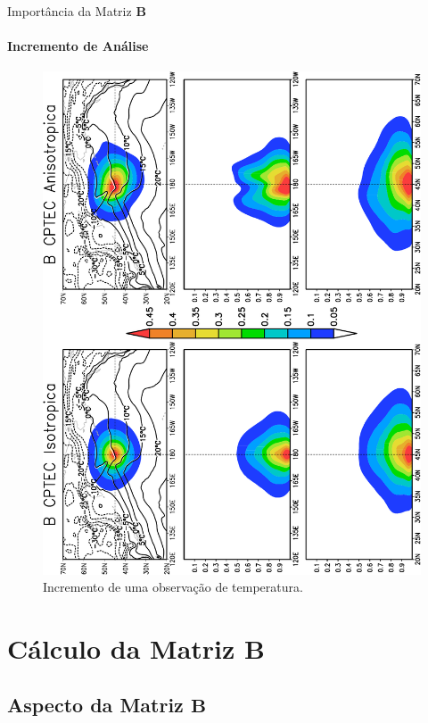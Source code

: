 \documentclass[10pt,aspectratio=169]{beamer}
\begin{document}
\begin{frame}[fragile]{Importância da Matriz $\mathbf{B}$}
\framesubtitle{Incremento de Análise}
    \vspace{-1.5em}
    \begin{figure}[H]
      \centering
      \includegraphics[trim={0.9cm
      0 13cm 14.25cm},clip,scale=1.,angle=-90]{./figs/incr_anl_t1000_Bcptec-artigo_rbmet-crop.pdf}
      \caption{Incremento de uma observação de temperatura.}
    \end{figure}
\end{frame}

\section{Cálculo da Matriz $\mathbf{B}$}

\subsection{Aspecto da Matriz $\mathbf{B}$}
\end{document}
